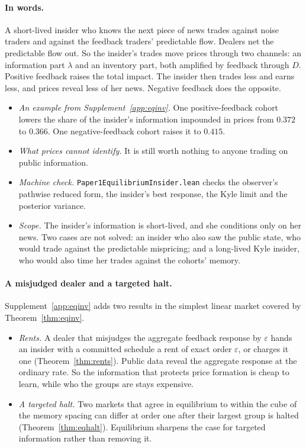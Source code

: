 \documentclass[12pt]{article}
\theoremstyle{definition}
\theoremstyle{remark}
\begin{document}
\paragraph{In words.} A short-lived insider who knows the next piece of news trades against noise traders and against the feedback traders' predictable flow. Dealers net the predictable flow out. So the insider's trades move prices through two channels: an information part $\lambda$ and an inventory part, both amplified by feedback through $D$. Positive feedback raises the total impact. The insider then trades less and earns less, and prices reveal less of her news. Negative feedback does the opposite.
\begin{itemize}[itemsep=1pt,topsep=2pt]
\item \emph{An example from Supplement~\ref{app:eqinv}.} One positive-feedback cohort lowers the share of the insider's information impounded in prices from $0.372$ to $0.366$. One negative-feedback cohort raises it to $0.415$.
\item \emph{What prices cannot identify.} It is still worth nothing to anyone trading on public information.
\item \emph{Machine check.} \nolinkurl{Paper1EquilibriumInsider.lean} checks the observer's pathwise reduced form, the insider's best response, the Kyle limit and the posterior variance.
\item \emph{Scope.} The insider's information is short-lived, and she conditions only on her news. Two cases are not solved: an insider who also saw the public state, who would trade against the predictable mispricing; and a long-lived Kyle insider, who would also time her trades against the cohorts' memory.
\end{itemize}

\paragraph{A misjudged dealer and a targeted halt.} Supplement~\ref{app:eqinv} adds two results in the simplest linear market covered by Theorem~\ref{thm:eqinv}.
\begin{itemize}[itemsep=1pt,topsep=2pt]
\item \emph{Rents.} A dealer that misjudges the aggregate feedback response by $\varepsilon$ hands an insider with a committed schedule a rent of exact order $\varepsilon$, or charges it one (Theorem~\ref{thm:rents}). Public data reveal the aggregate response at the ordinary rate. So the information that protects price formation is cheap to learn, while who the groups are stays expensive.
\item \emph{A targeted halt.} Two markets that agree in equilibrium to within the cube of the memory spacing can differ at order one after their largest group is halted (Theorem~\ref{thm:eqhalt}). Equilibrium sharpens the case for targeted information rather than removing it.
\end{itemize}
\end{document}
